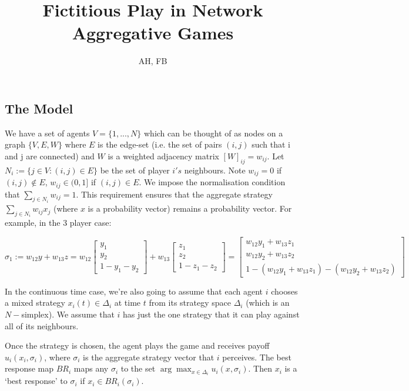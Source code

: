 \documentclass{article}
\title{Fictitious Play in Network Aggregative Games}
\author{AH, FB}
\theoremstyle{definition}
\begin{document}
	
	\maketitle
	
	
	\subsection*{The Model}
	
	We have a set of agents $V = \{1, ..., N \}$ which can be thought of as nodes on a graph $\{V, E, W\}$ where $E$ is the edge-set (i.e. the set of pairs $(i, j)$ such that i and j are connected) and $W$ is a weighted adjacency matrix $[W]_{ij} = w_{ij}$. Let $N_i := \{j \in V : (i, j) \in E\}$ be the set of player $i's$ neighbours. Note $w_{ij} = 0$ if $(i, j) \not\in E$, $w_{ij} \in (0, 1]$ if $(i, j) \in E$. We impose the normalisation condition that $\sum_{j \in N_i} w_{ij} = 1$. This requirement ensures that the aggregate strategy $\sum_{j \in N_i} w_{ij} x_j$ (where $x$ is a probability vector) remains a probability vector. For example, in the 3 player case:
	
	\begin{equation}
	\sigma_1 := w_{12} y + w_{13} z = 
	w_{12}
	\begin{bmatrix}
	y_1 \\ y_2 \\ 1 - y_1 - y_2
	\end{bmatrix}		
	+ 	w_{13}
	\begin{bmatrix}
	z_1 \\ z_2 \\ 1 - z_1 - z_2
	\end{bmatrix}	= 
	\begin{bmatrix}
	w_{12} y_1 + w_{13} z_1 \\ w_{12} y_2 + w_{13} z_2 \\ 1 - (w_{12} y_1 + w_{13} z_1) - (w_{12} y_2 + w_{13} z_2)
	\end{bmatrix}	
	\end{equation}
	
	In the continuous time case, we're also going to assume that each agent $i$ chooses a mixed strategy $x_i(t) \in \Delta_i$ at time $t$ from its strategy space $\Delta_i$ (which is an $N-$simplex). We assume that $i$ has just the one strategy that it can play against all of its neighbours.
	
	Once the strategy is chosen, the agent plays the game and receives payoff $u_i (x_i, \sigma_i)$, where $\sigma_i$ is the aggregate strategy vector that $i$ perceives. The best response map $BR_i$ maps any $\sigma_i$ to the set $\arg\max_{x \in \Delta_i} u_i (x, \sigma_i)$. Then $x_i$ is a `best response' to $\sigma_i$ if $x_i \in BR_i(\sigma_i)$.
	
\end{document}
